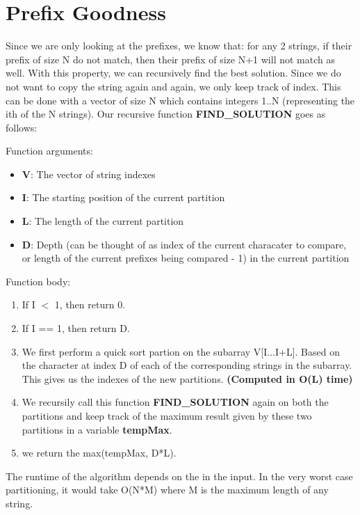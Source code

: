 \documentclass{article}
\begin{document}
\section{Prefix Goodness}
\noindent
Since we are only looking at the prefixes, we know that: for any 2 strings, if their prefix of size N do not match, then their prefix of size N+1 will not match as well. With this property, we can recursively find the best solution. Since we do not want to copy the string again and again, we only keep track of index. This can be done with a vector of size N which contains integers 1..N (representing the ith of the N strings).
Our recursive function \textbf{FIND\_SOLUTION} goes as follows:

\noindent
Function arguments:
\begin{itemize}
  \item \textbf{V}: The vector of string indexes
  \item \textbf{I}: The starting position of the current partition
  \item \textbf{L}: The length of the current partition
  \item \textbf{D}: Depth (can be thought of as index of the current characater to compare, or length of the current prefixes being compared - 1) in the current partition 
\end{itemize}

\noindent
Function body:
\begin{enumerate}
  \item If I $<$ 1, then return 0.
  \item If I == 1, then return D.
  \item We first perform a quick sort partion on the subarray V[I...I+L]. Based on the character at index D of each of the corresponding strings in the subarray. This gives us the indexes of the new partitions. \textbf{(Computed in O(L) time)}
  \item We recursily call this function \textbf{FIND\_SOLUTION} again on both the partitions and keep track of the maximum result given by these two partitions in a variable \textbf{tempMax}.
  \item we return the  max(tempMax, D*L).
\end{enumerate}

\noindent
The runtime of the algorithm depends on the in the input. In the very worst case partitioning, it would take O(N*M) where M is the maximum length of any string.
\end{document}

